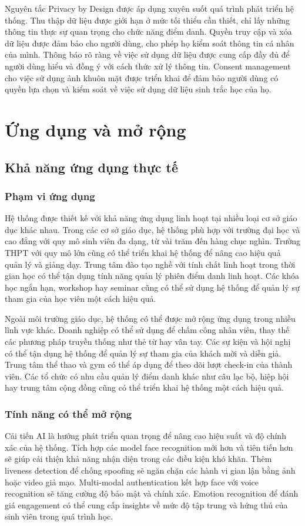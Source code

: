 \documentclass[12pt,a4paper]{report}
\begin{document}
Nguyên tắc Privacy by Design được áp dụng xuyên suốt quá trình phát triển hệ thống. Thu thập dữ liệu được giới hạn ở mức tối thiểu cần thiết, chỉ lấy những thông tin thực sự quan trọng cho chức năng điểm danh. Quyền truy cập và xóa dữ liệu được đảm bảo cho người dùng, cho phép họ kiểm soát thông tin cá nhân của mình. Thông báo rõ ràng về việc sử dụng dữ liệu được cung cấp đầy đủ để người dùng hiểu và đồng ý với cách thức xử lý thông tin. Consent management cho việc sử dụng ảnh khuôn mặt được triển khai để đảm bảo người dùng có quyền lựa chọn và kiểm soát về việc sử dụng dữ liệu sinh trắc học của họ.

\chapter{Ứng dụng và mở rộng}
\section{Khả năng ứng dụng thực tế}
\subsection{Phạm vi ứng dụng}
Hệ thống được thiết kế với khả năng ứng dụng linh hoạt tại nhiều loại cơ sở giáo dục khác nhau. Trong các cơ sở giáo dục, hệ thống phù hợp với trường đại học và cao đẳng với quy mô sinh viên đa dạng, từ vài trăm đến hàng chục nghìn. Trường THPT với quy mô lớn cũng có thể triển khai hệ thống để nâng cao hiệu quả quản lý và giảng dạy. Trung tâm đào tạo nghề với tính chất linh hoạt trong thời gian học có thể tận dụng tính năng quản lý phiên điểm danh linh hoạt. Các khóa học ngắn hạn, workshop hay seminar cũng có thể sử dụng hệ thống để quản lý sự tham gia của học viên một cách hiệu quả.

Ngoài môi trường giáo dục, hệ thống có thể được mở rộng ứng dụng trong nhiều lĩnh vực khác. Doanh nghiệp có thể sử dụng để chấm công nhân viên, thay thế các phương pháp truyền thống như thẻ từ hay vân tay. Các sự kiện và hội nghị có thể tận dụng hệ thống để quản lý sự tham gia của khách mời và diễn giả. Trung tâm thể thao và gym có thể áp dụng để theo dõi lượt check-in của thành viên. Các tổ chức có nhu cầu quản lý điểm danh khác như câu lạc bộ, hiệp hội hay trung tâm cộng đồng cũng có thể triển khai hệ thống một cách hiệu quả.

\subsection{Tính năng có thể mở rộng}
Cải tiến AI là hướng phát triển quan trọng để nâng cao hiệu suất và độ chính xác của hệ thống. Tích hợp các model face recognition mới hơn và tiên tiến hơn sẽ giúp cải thiện khả năng nhận diện trong các điều kiện khó khăn. Thêm liveness detection để chống spoofing sẽ ngăn chặn các hành vi gian lận bằng ảnh hoặc video giả mạo. Multi-modal authentication kết hợp face với voice recognition sẽ tăng cường độ bảo mật và chính xác. Emotion recognition để đánh giá engagement có thể cung cấp insights về mức độ tập trung và hứng thú của sinh viên trong quá trình học.
\end{document}

